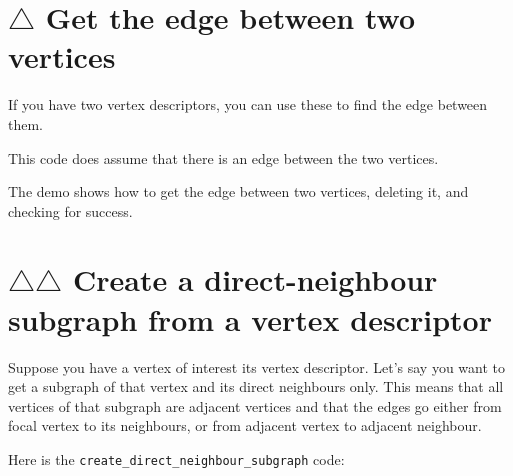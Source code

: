 

\section{$\triangle$ Get the edge between two vertices}
\label{subsec:get_edge_between_vertices}

If you have two vertex descriptors, you can use these to find the edge between
them.



This code does assume that there is an edge between the two vertices.

The demo shows how to get the edge between two vertices, deleting it, and
 checking for success.



\section{$\triangle$$\triangle$ Create a direct-neighbour subgraph from a vertex descriptor}
\label{subsec:create_direct_neighbour_subgraph}

Suppose you have a vertex of interest its vertex descriptor.
Let's say you want to get a subgraph of that vertex and its direct neighbours
only.
This means that all vertices of that subgraph are adjacent vertices and
that the edges go either from focal vertex to its neighbours, or from adjacent
vertex to adjacent neighbour.

Here is the \verb;create_direct_neighbour_subgraph; code:



